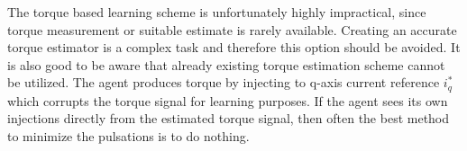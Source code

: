 
The torque based learning scheme is unfortunately highly impractical, since torque measurement or suitable estimate is rarely available. Creating an accurate torque estimator is a complex task and therefore this option should be avoided. It is also good to be aware that already existing torque estimation scheme cannot be utilized. The agent produces torque by injecting to q-axis current reference $i^*_q$ which corrupts the torque signal for learning purposes. If the agent sees its own injections directly from the estimated torque signal, then often the best method to minimize the pulsations is to do nothing.




